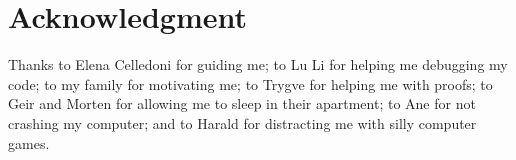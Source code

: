 \section*{Acknowledgment}
Thanks to Elena Celledoni for guiding me; to Lu Li for helping me debugging my code; to my family for motivating me; to Trygve for helping me with proofs; to Geir and Morten for allowing me to sleep in their apartment; to Ane for not crashing my computer;  and to Harald for distracting me with silly computer games. 